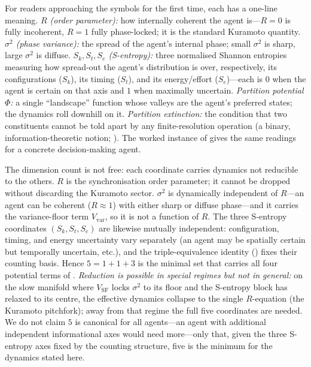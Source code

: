 \documentclass[11pt,twocolumn,a4paper]{article}
\newcommand{\Sk}{S_k}
\newcommand{\St}{S_t}
\newcommand{\Se}{S_e}
\newcommand{\Pot}{\Phi}
\newcommand{\Ord}{R}
\begin{document}
\begin{remark}
\label{rem:reading-guide}
For readers approaching the symbols for the first time, each has a one-line
meaning. \emph{$\Ord$ (order parameter):} how internally coherent the agent
is---$\Ord=0$ is fully incoherent, $\Ord=1$ fully phase-locked; it is the
standard Kuramoto quantity. \emph{$\sigma^2$ (phase variance):} the spread of the
agent's internal phase; small $\sigma^2$ is sharp, large $\sigma^2$ is diffuse.
\emph{$\Sk,\St,\Se$ (S-entropy):} three normalised Shannon entropies measuring
how spread-out the agent's distribution is over, respectively, its configurations
($\Sk$), its timing ($\St$), and its energy/effort ($\Se$)---each is $0$ when the
agent is certain on that axis and $1$ when maximally uncertain. \emph{Partition
potential $\Pot$:} a single ``landscape'' function whose valleys are the agent's
preferred states; the dynamics roll downhill on it. \emph{Partition extinction:}
the condition that two constituents cannot be told apart by any finite-resolution
operation (a binary, information-theoretic notion; ). The
worked instance of  gives the same readings for a
concrete decision-making agent.
\end{remark}

\begin{remark}
\label{rem:why-five}
The dimension count is not free: each coordinate carries dynamics not reducible to
the others. \emph{$\Ord$} is the synchronisation order parameter; it cannot be
dropped without discarding the Kuramoto sector. \emph{$\sigma^2$} is dynamically
independent of $\Ord$---an agent can be coherent ($\Ord\approx1$) with either
sharp or diffuse phase---and it carries the variance-floor term
$V_{\mathrm{var}}$, so it is not a function of $\Ord$. The three S-entropy
coordinates $(\Sk,\St,\Se)$ are likewise mutually independent: configuration,
timing, and energy uncertainty vary separately (an agent may be spatially certain
but temporally uncertain, etc.), and the triple-equivalence identity
() fixes their counting basis. Hence $5=1+1+3$ is the minimal
set that carries all four potential terms of .
\emph{Reduction is possible in special regimes but not in general:} on the
slow manifold where $V_{\mathrm{SF}}$ locks $\sigma^2$ to its floor and the
S-entropy block has relaxed to its centre, the effective dynamics collapse to the
single $\Ord$-equation (the Kuramoto pitchfork); away from that regime the full
five coordinates are needed. We do not claim $5$ is canonical for all agents---an
agent with additional independent informational axes would need more---only that,
given the three S-entropy axes fixed by the counting structure, five is the
minimum for the dynamics stated here.
\end{remark}
\end{document}
